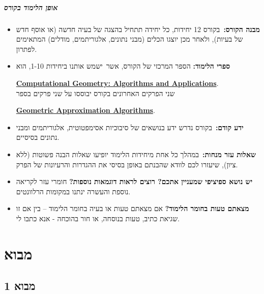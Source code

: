 \documentclass[
]{book}
\theoremstyle{definition}
\theoremstyle{definition}
\theoremstyle{definition}
\theoremstyle{definition}
\theoremstyle{remark}
\begin{document}
\hypertarget{ux5d0ux5d5ux5e4ux5df-ux5d4ux5dcux5d9ux5deux5d5ux5d3-ux5d1ux5e7ux5d5ux5e8ux5e1}{%
\subsubsection*{\texorpdfstring{\textbf{אופן הלימוד בקורס}}{אופן הלימוד בקורס}}\label{ux5d0ux5d5ux5e4ux5df-ux5d4ux5dcux5d9ux5deux5d5ux5d3-ux5d1ux5e7ux5d5ux5e8ux5e1}}

\begin{itemize}
\item
  \textbf{מבנה הקורס:}~בקורס 12 יחידות, כל יחידה תתחיל בהצגה של בעיה חדשה (או אוסף חדש של בעיות), ולאחר מכן יוצגו הכלים (מבני נתונים, אלגוריתמים, מודלים) המתאימים לפתרון.
\item
  \textbf{ספרי הלימוד:} הספר המרכזי של הקורס, אשר~ישמש אותנו ביחידות 1-10, הוא~

  \href{https://www.amazon.com/Computational-Geometry-Applications-Mark-Berg-ebook-dp-B014P9HOKU/dp/B014P9HOKU/}{\textbf{Computational Geometry: Algorithms and Applications}}.\\
  שני הפרקים האחרונים בקורס יבוססו על שני פרקים בספר

  \href{https://sarielhp.org/book/}{\textbf{Geometric Approximation Algorithms}}.
\item
  \textbf{ידע קודם:}~בקורס נדרש ידע בנושאים של סיבוכיות אסימפטוטית, אלגוריתמים ומבני נתונים בסיסיים.
\item
  \textbf{שאלות עזר מנחות:}~במהלך כל אחת מיחידות הלימוד יופיעו שאלות הבנה פשוטות (ללא ציון), שיעזרו לכם לוודא שהבנתם באופן בסיסי את ההגדרות והרעיונות של הפרק.
\item
  \textbf{יש נושא ספיציפי שמעניין אתכם? רוצים לראות דוגמאות נוספות?} חומרי עזר לקריאה נוספת והעשרה ינתנו במקומות הרלוונטים.~
\item
  \textbf{מצאתם טעות בחומר הלימוד?} אם מצאתם טעות או בעיה בחומר הלימוד -- בין אם זו שגיאת כתיב, טעות בנוסחה, או חור בהוכחה - אנא כתבו לי.
\end{itemize}

\hypertarget{part-ux5deux5d1ux5d5ux5d0}{%
\part{מבוא}\label{part-ux5deux5d1ux5d5ux5d0}}

\hypertarget{ux5deux5d1ux5d5ux5d0-1}{%
\chapter{מבוא 1}\label{ux5deux5d1ux5d5ux5d0-1}}
\end{document}
